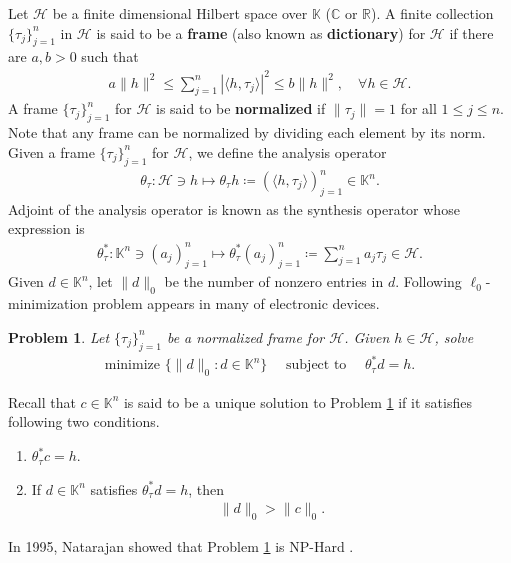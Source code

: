 \documentclass{amsart}
\newtheorem{problem}[theorem]{Problem}
\begin{document}
Let $\mathcal{H}$ be a  finite dimensional Hilbert  space over $\mathbb{K}$ ($\mathbb{C}$ or $\mathbb{R}$). A  finite collection $\{\tau_j\}_{j=1}^n$ in $\mathcal{H}$ is said to be a \textbf{frame} (also known as \textbf{dictionary}) \cite{BEDETTOFICKUS, HANKORNELSON} for $\mathcal{H}$ if there are $a, b >0$ such that 
\begin{align*}
	a\|h\|^2\leq \sum_{j=1}^{n}|\langle h,  \tau_j \rangle|^2\leq b \|h\|^2, \quad \forall h \in \mathcal{H}.
\end{align*}
 A frame $\{\tau_j\}_{j=1}^n$ for  $\mathcal{H}$ is said to be \textbf{normalized} if $\|\tau_j\|=1$ for all $1\leq j \leq n$. Note that any frame can be normalized by dividing each element by its norm. Given a frame $\{\tau_j\}_{j=1}^n$ for  $\mathcal{H}$, we define the analysis operator
\begin{align*}
	\theta_\tau:\mathcal{H}\ni h \mapsto \theta_\tau h\coloneqq (\langle h,  \tau_j \rangle)_{j=1}^n \in \mathbb{K}^n.
\end{align*}
Adjoint of the analysis operator is known as  the synthesis operator whose expression  is 
\begin{align*}
\theta_\tau^*: \mathbb{K}^n \ni (a_j)_{j=1}^n \mapsto \theta_\tau^*(a_j)_{j=1}^n\coloneqq\sum_{j=1}^{n}a_j\tau_j \in \mathcal{H}.
\end{align*}
Given $d\in \mathbb{K}^n$, let $\|d\|_0$ be the number of nonzero entries in $d$.   Following $\ell_0$-minimization problem appears in many  of electronic devices.
\begin{problem} \label{P0}
 Let $\{\tau_j\}_{j=1}^n$ be a normalized frame for  $\mathcal{H}$.  Given $h \in \mathcal{H}$, solve 	
\begin{align*}
	\text{minimize }\{\|d\|_0:d\in \mathbb{K}^n\} \quad \text{ subject to } \quad \theta_\tau^*d=h.
\end{align*}
\end{problem}
Recall that $c \in \mathbb{K}^n$ is said to be a unique solution to Problem \ref{P0}  if it satisfies following two conditions.
\begin{enumerate}[\upshape(i)]
	\item $\theta_\tau^*c=h$.
	\item If $d \in \mathbb{K}^n$ satisfies $\theta_\tau^*d=h$, then 
\begin{align*}
	\|d\|_0>\|c\|_0.
\end{align*}
\end{enumerate}
In 1995, Natarajan showed that Problem \ref{P0} is NP-Hard \cite{NATARAJAN, FOUCARTRAUHUT}. 
\end{document}
